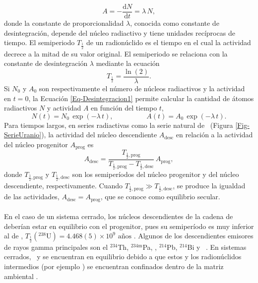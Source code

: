\begin{equation}\label{Eq-Desintegracion1}
A = - \dfrac{\text{d}N}{\text{d}t} = \lambda\,N,
\end{equation}
donde la constante de proporcionalidad $\lambda$, conocida como constante de desintegración, depende del núcleo radiactivo y tiene unidades recíprocas de tiempo. El semiperiodo $T_{\frac{1}{2}}$ de un radionúclido es el tiempo en el cual la actividad decrece a la mitad de su valor original. El semiperiodo se relaciona con la constante de desintegración $\lambda$ mediante la ecuación
\begin{equation}
T_{\frac{1}{2}} = \dfrac{\ln(2)}{\lambda}.
\end{equation}
Si $N_0$ y $A_0$ son respectivamente el número de núcleos radiactivos y la actividad en $t=0$, la Ecuación \ref{Eq-Desintegracion1} permite calcular la cantidad de átomos radiactivos $N$ y actividad $A$ en función del tiempo $t$,
\begin{equation}
N(t) = N_0\,\exp(-\lambda\,t), \hspace{2cm} A(t) = A_0\,\exp(-\lambda\,t).
\end{equation}
Para tiempos largos, en series radiactivas como la serie natural de \UDosTresOcho\, (Figura \ref{Fig-SerieUranio}), la actividad del núcleo descendiente $A_{\text{desc}}$ en relación a la actividad del núcleo progenitor $A_{\text{prog}}$ es \cite{gilmore2008}
\begin{equation}
A_{\text{desc}} = \dfrac{T_{\frac{1}{2}, \text{prog}} }{T_{\frac{1}{2}, \text{prog}}  - T_{\frac{1}{2}, \text{desc}}}\, A_{\text{prog}},
\end{equation}
donde $T_{\frac{1}{2}, \text{prog}}$ y $T_{\frac{1}{2}, \text{desc}}$ son los semiperíodos del núcleo progenitor y del núcleo descendiente, respectivamente. Cuando $T_{\frac{1}{2}, \text{prog}} \gg T_{\frac{1}{2}, \text{desc}}$, se produce la igualdad de las actividades, $A_{\text{desc}} = A_{\text{prog}}$, que se conoce como equilibrio secular.
\\
\\
En el caso de un sistema cerrado, los núcleos descendientes de la cadena de \UDosTresOcho\, deberían estar en equilibrio con el progenitor, pues su semiperíodo es muy inferior al de \UDosTresOcho, $T_{\frac{1}{2}}(^{238}\text{U}) = 4.468(5)\times 10^9 \text{ años}$  \cite{DataDecayEvaluation}. Algunos de los descendientes emisores de rayos gamma principales son el $^{234}$Th, $^{234\text{m}}$Pa, \Ra, $^{214}$Pb, $^{214}$Bi y \PbCero\, \cite{gilmore2008}. En sistemas cerrados, \PbCero\, y \Ra se encuentran en equilibrio debido a que estos y los radionúclidos intermedios (por ejemplo \PbCuatro) se encuentran confinados dentro de la matriz ambiental \cite{sanchez2012radiocronologia}.
